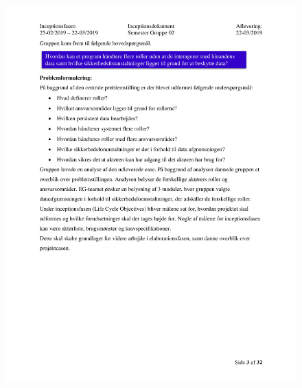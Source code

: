 \begin{figure}[hb]
  \includegraphics[scale = 0.33]{./PNG/Inceptions/Gruppe02+InceptionsDokument-04.jpg} 
\end{figure}

